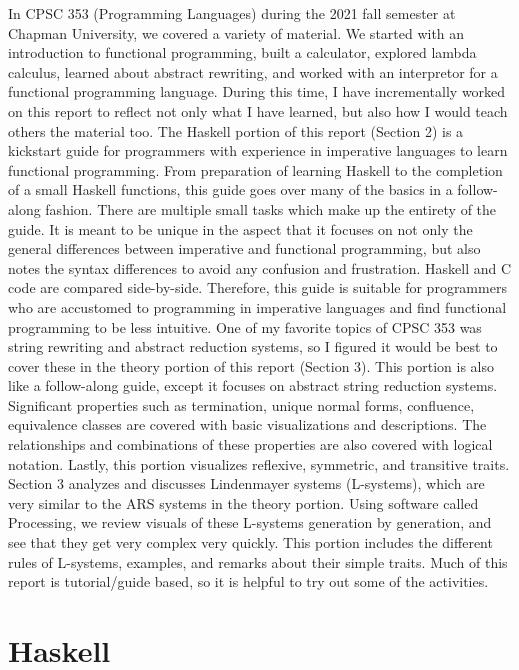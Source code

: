\documentclass{article}
\begin{document}
\medskip\noindent
In CPSC 353 (Programming Languages) during the 2021 fall semester at Chapman University, we covered a variety of material. We started with an introduction to functional programming, built a calculator, explored lambda calculus, learned about abstract rewriting, and worked with an interpretor for a functional programming language. During this time, I have incrementally worked on this report to reflect not only what I have learned, but also how I would teach others the material too. The Haskell portion of this report (Section 2) is a kickstart guide for programmers with experience in imperative languages to learn functional programming. From preparation of learning Haskell to the completion of a small Haskell functions, this guide goes over many of the basics in a follow-along fashion. There are multiple small tasks which make up the entirety of the guide. It is meant to be unique in the aspect that it focuses on not only the general differences between imperative and functional programming, but also notes the syntax differences to avoid any confusion and frustration. Haskell and C code are compared side-by-side. Therefore, this guide is suitable for programmers who are accustomed to programming in imperative languages and find functional programming to be less intuitive. One of my favorite topics of CPSC 353 was string rewriting and abstract reduction systems, so I figured it would be best to cover these in the theory portion of this report (Section 3). This portion is also like a follow-along guide, except it focuses on abstract string reduction systems. Significant properties such as termination, unique normal forms, confluence, equivalence classes are covered with basic visualizations and descriptions. The relationships and combinations of these properties are also covered with logical notation. Lastly, this portion visualizes reflexive, symmetric, and transitive traits. Section 3 analyzes and discusses Lindenmayer systems (L-systems), which are very similar to the ARS systems in the theory portion. Using software called Processing, we review visuals of these L-systems generation by generation, and see that they get very complex very quickly. This portion includes the different rules of L-systems, examples, and remarks about their simple traits. Much of this report is tutorial/guide based, so it is helpful to try out some of the activities.

\section{Haskell}\label{haskell}
\end{document}
